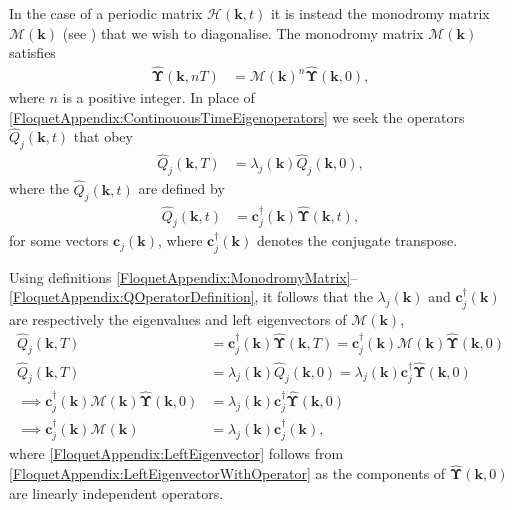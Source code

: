 In the case of a periodic matrix $\mathcal{H}(\bm{k}, t)$ it is instead the monodromy matrix $\mathcal{M}(\bm{k})$ (see ) that we wish to diagonalise. The monodromy matrix $\mathcal{M}(\bm{k})$ satisfies
\begin{align}
    \label{FloquetAppendix:MonodromyMatrix}
    \hat{\bm{\Upsilon}}(\bm{k}, nT) &= \mathcal{M}(\bm{k})^n \hat{\bm{\Upsilon}}(\bm{k}, 0),
\end{align}
where $n$ is a positive integer. In place of \eqref{FloquetAppendix:ContinouousTimeEigenoperators} we seek the operators $\hat{Q}_j(\bm{k}, t)$ that obey
\begin{align}
    \label{FloquetAppendix:QOperatorEvolution}
    \hat{Q}_j(\bm{k}, T) &= \lambda_j(\bm{k}) \hat{Q}_j(\bm{k}, 0),
\end{align}
where the $\hat{Q}_j(\bm{k}, t)$ are defined by
\begin{align}
    \label{FloquetAppendix:QOperatorDefinition}
    \hat{Q}_j(\bm{k}, t) &= \bm{c}_j^\dagger(\bm{k}) \hat{\bm{\Upsilon}}(\bm{k}, t),
\end{align}
for some vectors $\bm{c}_j(\bm{k})$, where $\bm{c}_j^\dagger(\bm{k})$ denotes the conjugate transpose. 

Using definitions \eqref{FloquetAppendix:MonodromyMatrix}--\eqref{FloquetAppendix:QOperatorDefinition}, it follows that the $\lambda_j(\bm{k})$ and $\bm{c}_j^\dagger(\bm{k})$ are respectively the eigenvalues and left eigenvectors of $\mathcal{M}(\bm{k})$,
\begin{align}
    \hat{Q}_j(\bm{k}, T) &= \bm{c}_j^\dagger(\bm{k}) \hat{\bm{\Upsilon}}(\bm{k}, T) = \bm{c}_j^\dagger(\bm{k}) \mathcal{M}(\bm{k}) \hat{\bm{\Upsilon}}(\bm{k}, 0) \\
    \hat{Q}_j(\bm{k}, T) &= \lambda_j(\bm{k}) \hat{Q}_j(\bm{k}, 0) = \lambda_j(\bm{k}) \bm{c}_j^\dagger \hat{\bm{\Upsilon}}(\bm{k}, 0)\\
    \implies \bm{c}_j^\dagger(\bm{k}) \mathcal{M}(\bm{k}) \hat{\bm{\Upsilon}}(\bm{k}, 0) &= \lambda_j(\bm{k}) \bm{c}_j^\dagger \hat{\bm{\Upsilon}}(\bm{k}, 0) \label{FloquetAppendix:LeftEigenvectorWithOperator}\\
    \implies \bm{c}_j^\dagger(\bm{k}) \mathcal{M}(\bm{k}) &= \lambda_j(\bm{k}) \bm{c}_j^\dagger(\bm{k}), \label{FloquetAppendix:LeftEigenvector}
\end{align}
where \eqref{FloquetAppendix:LeftEigenvector} follows from \eqref{FloquetAppendix:LeftEigenvectorWithOperator} as the components of $\hat{\bm{\Upsilon}}(\bm{k}, 0)$ are linearly independent operators.


